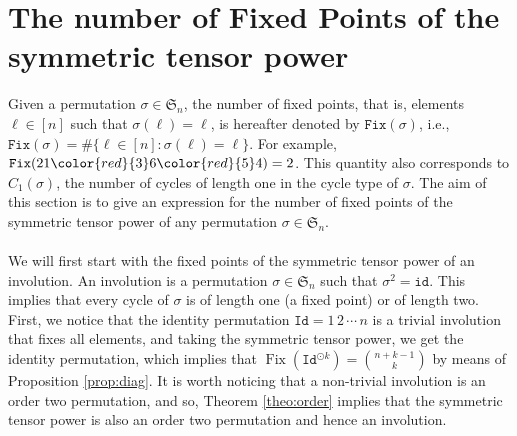 \documentclass[12pt]{amsart}
\newcommand{\fix}{\operatorname{Fix}}
\begin{document}
\section{The number of Fixed Points of the symmetric tensor power}

    Given a permutation $\sigma \in \mathfrak{S}_n$, the number of fixed points, that is, elements $\ell\in [n]$ such that $\sigma (\ell)=\ell$, is hereafter denoted by $\texttt{Fix}(\sigma)$, i.e., $\texttt{Fix}(\sigma) = \# \{ \ell\in [n]: \sigma (\ell)=\ell \}$. For example, $\texttt{Fix}(21{\color{red}{3}}6{\color{red}{5}}4)=2$. This quantity also corresponds to $C_1(\sigma)$, the number of cycles of length one in the cycle type of $\sigma$. The aim of this section is to give an expression for the number of fixed points of the symmetric tensor power of any permutation $\sigma \in \mathfrak{S}_n$.\\\\
    We will first start with the fixed points of the symmetric tensor power of an involution. An involution is a permutation $\sigma \in \mathfrak{S}_n$ such that $\sigma ^2 = \texttt{id}$. This implies that every cycle of $\sigma$ is of length one (a fixed point) or of length two.  First, we notice that the identity permutation $\mathtt{Id} = 1\,2\, \cdots \, n$ is a trivial involution that fixes all elements, and taking the symmetric tensor power, we get the identity permutation, which implies that $\fix (\mathtt{Id}^{\odot k}) = \binom{n+k-1}{k}$ by means of Proposition \ref{prop:diag}. It is worth noticing that a non-trivial involution is an order two permutation, and so, Theorem \ref{theo:order} implies that the symmetric tensor power is also an order two permutation and hence an involution.\\
\end{document}
